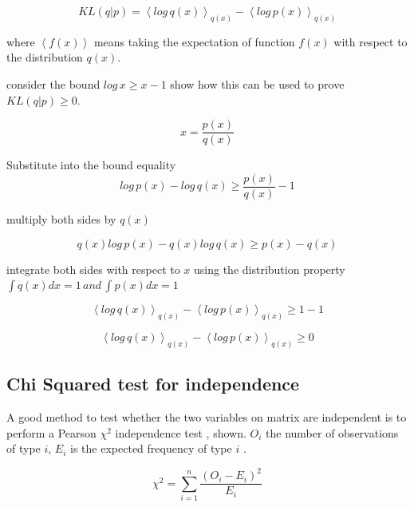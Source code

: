 \begin{equation}
    KL(q|p)= \left \langle log\, q(x) \right \rangle_{q(x)}-\left \langle log\, p(x) \right \rangle_{q(x)}
\label{eq:klproofstart}
\end{equation}

where $\left \langle f(x) \right \rangle$ means taking the expectation of function $f(x)$ with respect to the distribution $q(x)$.

consider the bound $log\, x \geq x-1$ show how this can be used to prove $KL(q|p)\geq0$.

\begin{equation}
    x = \frac{p(x)}{q(x)}
\end{equation}

Substitute into the bound equality
\begin{equation}
   log\,p(x)-log\,q(x) \geq \frac{p(x)}{q(x)}-1 
\end{equation}

multiply both sides by $q(x)$

\begin{equation}
    q(x)log\,p(x)-q(x)log\,q(x) \geq p(x)-q(x) 
\end{equation}

integrate both sides with respect to $x$ using the distribution property $\int q(x)dx=1 \,and \,\int p(x)dx=1 $

\begin{equation}
    \left \langle log\, q(x) \right \rangle_{q(x)}-\left \langle log\, p(x) \right \rangle_{q(x)} \geq 1-1
\end{equation}


\begin{equation}
    \left \langle log\, q(x) \right \rangle_{q(x)}-\left \langle log\, p(x) \right \rangle_{q(x)} \geq 0
\label{eq:klproofend}
\end{equation}

\subsection{Chi Squared test for independence}
A good method to test whether the two variables on  matrix are independent is to perform a Pearson $\chi^2$ independence test \cite{pearson1900}, shown. $O_i$ the number of observations of type $i$, $E_i$ is the expected frequency of type $i$ \cite{pearsonschisquaredtest2016}.

\begin{equation}
    \chi ^2 = \sum_{i=1}^n \frac{(O_i-E_i)^2}{E_i}
\end{equation}

